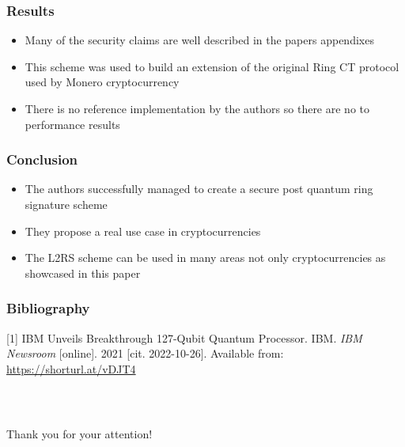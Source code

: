 \documentclass[%
  14pt,       				%
	c,                  %
	aspectratio=1610,   %
	unicode,						%
]{beamer}				    	%
\begin{document}
\begin{frame}
  \frametitle{Results}
  \large{
    \begin{itemize}
      \item Many of the security claims are well described in the papers appendixes
      \item This scheme was used to build an extension of the original Ring CT protocol used by Monero cryptocurrency
      \item There is no reference implementation by the authors so there are no to performance results
    \end{itemize}
  }
\end{frame}

\begin{frame}
  \frametitle{Conclusion}
  \large{
    \begin{itemize}
      \item The authors successfully managed to create a secure post quantum ring signature scheme
      \item They propose a real use case in cryptocurrencies
      \item The L2RS scheme can be used in many areas not only cryptocurrencies as showcased in this paper
    \end{itemize}
  }
\end{frame}

\begin{frame}
  \frametitle{Bibliography}
  \small{
    [1] IBM Unveils Breakthrough 127-Qubit Quantum Processor. IBM. \textit{IBM Newsroom} [online]. 2021 [cit. 2022-10-26]. Available from: \url{https://shorturl.at/vDJT4}
  }
\end{frame}

\begin{frame}[c]
  \frametitle{\mbox{ }}
  \begin{center}
    {\Huge Thank you for your attention!}
  \end{center}
\end{frame}
\end{document}
